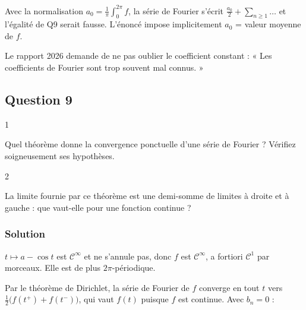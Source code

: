 \documentclass[11pt,a4paper]{article}
\newcommand{\equationajustee}[1]{%
  \sbox{\boiteequation}{$\displaystyle #1$}%
  \ifdim\wd\boiteequation>\linewidth
    \[\resizebox{\linewidth}{!}{\usebox{\boiteequation}}\]%
  \else
    \[#1\]%
  \fi}
\begin{document}
\equationajustee{b_n=\frac1\pi\int_{-\pi}^{\pi}f(t)\sin(nt)\,\mathrm dt=0.}

\begin{piege}

Avec la normalisation \(a_0=\frac1\pi\int_0^{2\pi}f\), la série de Fourier s'écrit \(\frac{a_0}2+\sum_{n\ge1}\dots\) et l'égalité de Q9 serait fausse. L'énoncé impose implicitement \(a_0\) = valeur moyenne de \(f\).

\end{piege}

\begin{jury}

Le rapport 2026 demande de ne pas oublier le coefficient constant : « Les coefficients de Fourier sont trop souvent mal connus. »

\end{jury}

\hypertarget{question-9}{%
\subsection{Question 9}\label{question-9}}

\begin{indication}{1}

Quel théorème donne la convergence ponctuelle d'une série de Fourier ? Vérifiez soigneusement ses hypothèses.

\end{indication}

\begin{indication}{2}

La limite fournie par ce théorème est une demi-somme de limites à droite et à gauche : que vaut-elle pour une fonction continue ?

\end{indication}

\hypertarget{solution-8}{%
\subsubsection{Solution}\label{solution-8}}

\(t\mapsto a-\cos t\) est \(\mathcal C^\infty\) et ne s'annule pas, donc \(f\) est \(\mathcal C^\infty\), a fortiori \(\mathcal C^1\) par morceaux. Elle est de plus \(2\pi\)-périodique.

Par le théorème de Dirichlet, la série de Fourier de \(f\) converge en tout \(t\) vers \(\frac12\big(f(t^+)+f(t^-)\big)\), qui vaut \(f(t)\) puisque \(f\) est continue. Avec \(b_n=0\) :
\end{document}
